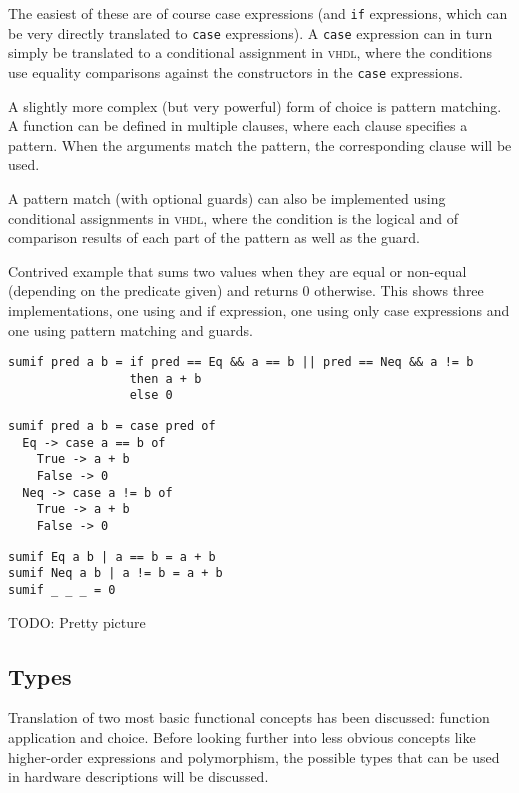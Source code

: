 \documentclass[conference,pdf,a4paper,10pt,final,twoside,twocolumn]{IEEEtran}
\def\VHDL{\textsc{vhdl}}
\def\hs#1{\texttt{#1}}
\begin{document}
    The easiest of these are of course case expressions (and \hs{if}
    expressions, which can be very directly translated to \hs{case}
    expressions). A \hs{case} expression can in turn simply be
    translated to a conditional assignment in \VHDL, where the
    conditions use equality comparisons against the constructors in the
    \hs{case} expressions.

    A slightly more complex (but very powerful) form of choice is
    pattern matching. A function can be defined in multiple clauses,
    where each clause specifies a pattern. When the arguments match the
    pattern, the corresponding clause will be used.

    A pattern match (with optional guards) can also be implemented using
    conditional assignments in \VHDL, where the condition is the logical
    and of comparison results of each part of the pattern as well as the
    guard.

    Contrived example that sums two values when they are equal or
    non-equal (depending on the predicate given) and returns 0
    otherwise. This shows three implementations, one using and if
    expression, one using only case expressions and one using pattern
    matching and guards.

\begin{verbatim}
sumif pred a b = if pred == Eq && a == b || pred == Neq && a != b
                 then a + b
                 else 0
\end{verbatim}

\begin{verbatim}
sumif pred a b = case pred of
  Eq -> case a == b of
    True -> a + b
    False -> 0
  Neq -> case a != b of
    True -> a + b
    False -> 0
\end{verbatim}

\begin{verbatim}
sumif Eq a b | a == b = a + b
sumif Neq a b | a != b = a + b
sumif _ _ _ = 0
\end{verbatim}

  TODO: Pretty picture

  \subsection{Types}
    Translation of two most basic functional concepts has been
    discussed: function application and choice. Before looking further
    into less obvious concepts like higher-order expressions and
    polymorphism, the possible types that can be used in hardware
    descriptions will be discussed.
\end{document}
